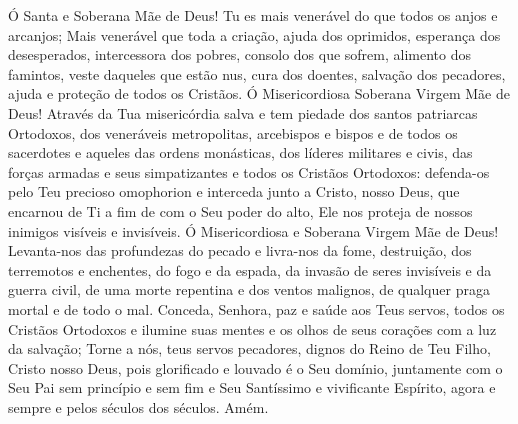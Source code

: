 \documentclass{subfiles}
\begin{document}
Ó Santa e Soberana Mãe de Deus! Tu es mais venerável do que todos os anjos e
arcanjos; Mais venerável que toda a criação, ajuda dos oprimidos, esperança dos
desesperados, intercessora dos pobres, consolo dos que sofrem, alimento dos
famintos, veste daqueles que estão nus, cura dos doentes, salvação dos
pecadores, ajuda e proteção de todos os Cristãos. Ó Misericordiosa Soberana
Virgem Mãe de Deus! Através da Tua misericórdia salva e tem piedade dos santos
patriarcas Ortodoxos, dos veneráveis metropolitas, arcebispos e bispos e de
todos os sacerdotes e aqueles das ordens monásticas, dos líderes militares e
civis, das forças armadas e seus simpatizantes e todos os Cristãos Ortodoxos:
defenda-os pelo Teu precioso omophorion e interceda junto a Cristo, nosso Deus,
que encarnou de Ti a fim de com o Seu poder do alto, Ele nos proteja de nossos
inimigos visíveis e invisíveis. Ó Misericordiosa e Soberana Virgem Mãe de Deus!
Levanta-nos das profundezas do pecado e livra-nos da fome, destruição, dos
terremotos e enchentes, do fogo e da espada, da invasão de seres invisíveis e da
guerra civil, de uma morte repentina e dos ventos malignos, de qualquer praga
mortal e de todo o mal. Conceda, Senhora, paz e saúde aos Teus servos, todos os
Cristãos Ortodoxos e ilumine suas mentes e os olhos de seus corações com a luz
da salvação; Torne a nós, teus servos pecadores, dignos do Reino de Teu Filho,
Cristo nosso Deus, pois glorificado e louvado é o Seu domínio, juntamente com o
Seu Pai sem princípio e sem fim e Seu Santíssimo e vivificante Espírito, agora e
sempre e pelos séculos dos séculos. Amém.
\end{document}
